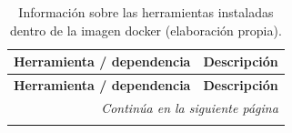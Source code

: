\documentclass[12pt]{article}
\begin{document}
\begin{longtable}{|c|p{6cm}|}
    \caption{Información sobre las herramientas instaladas dentro de la imagen docker (elaboración propia).}
    \label{tabla:asasd} \\
    \hline
    \textbf{Herramienta / dependencia} & \textbf{Descripción}  \\
    \hline
    \endfirsthead
    
    \hline
    \textbf{Herramienta / dependencia} & \textbf{Descripción} \\
    \hline
    \endhead
    
    \hline \multicolumn{2}{r}{\textit{Continúa en la siguiente página}} \\
    \endfoot
    
    \hline
    \endlastfoot
    

\end{longtable}
\end{document}
